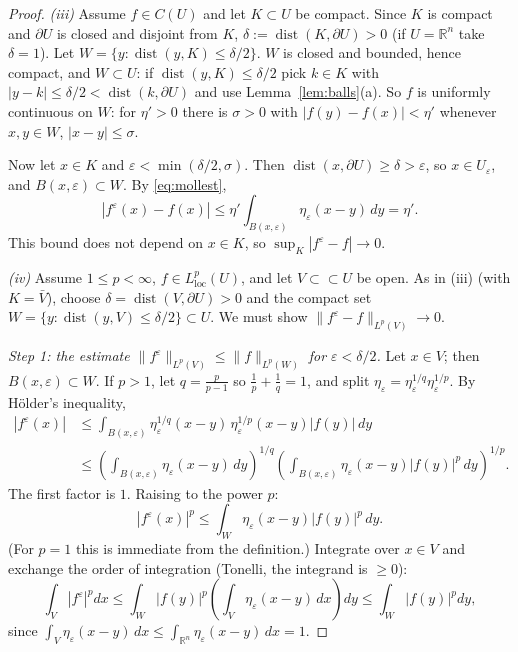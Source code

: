 \documentclass[11pt]{article}
\theoremstyle{plain}
\theoremstyle{definition}
\theoremstyle{remark}
\begin{document}
\begin{proof}
\emph{(iii)} Assume $f \in C(U)$ and let $K \subset U$ be compact. Since $K$ is compact and $\partial U$ is closed and disjoint from $K$, $\delta := \operatorname{dist}(K, \partial U) > 0$ (if $U = \mathbb{R}^n$ take $\delta = 1$). Let $W = \{ y : \operatorname{dist}(y, K) \leq \delta/2 \}$. $W$ is closed and bounded, hence compact, and $W \subset U$: if $\operatorname{dist}(y,K) \le \delta/2$ pick $k \in K$ with $|y - k| \leq \delta/2 < \operatorname{dist}(k,\partial U)$ and use Lemma~\ref{lem:balls}(a). So $f$ is uniformly continuous on $W$: for $\eta' > 0$ there is $\sigma > 0$ with $|f(y) - f(x)| < \eta'$ whenever $x, y \in W$, $|x - y| \leq \sigma$.

Now let $x \in K$ and $\varepsilon < \min(\delta/2, \sigma)$. Then $\operatorname{dist}(x,\partial U) \geq \delta > \varepsilon$, so $x \in U_\varepsilon$, and $B(x,\varepsilon) \subset W$. By \eqref{eq:mollest},
$$ |f^\varepsilon(x) - f(x)| \leq \eta' \int_{B(x,\varepsilon)} \eta_\varepsilon(x-y)\, dy = \eta'. $$
This bound does not depend on $x \in K$, so $\sup_K |f^\varepsilon - f| \to 0$.

\emph{(iv)} Assume $1 \leq p < \infty$, $f \in L^p_{\mathrm{loc}}(U)$, and let $V \subset\subset U$ be open. As in (iii) (with $K = \bar V$), choose $\delta = \operatorname{dist}(V,\partial U) > 0$ and the compact set $W = \{ y : \operatorname{dist}(y, V) \le \delta/2\} \subset U$. We must show $\|f^\varepsilon - f\|_{L^p(V)} \to 0$.

\emph{Step 1: the estimate $\|f^\varepsilon\|_{L^p(V)} \leq \|f\|_{L^p(W)}$ for $\varepsilon < \delta/2$.} Let $x \in V$; then $B(x,\varepsilon) \subset W$. If $p > 1$, let $q = \frac{p}{p-1}$ so $\frac1p + \frac1q = 1$, and split $\eta_\varepsilon = \eta_\varepsilon^{1/q}\eta_\varepsilon^{1/p}$. By H\"older's inequality,
\begin{align*}
|f^\varepsilon(x)| &\leq \int_{B(x,\varepsilon)} \eta_\varepsilon^{1/q}(x-y)\, \eta_\varepsilon^{1/p}(x-y)|f(y)|\, dy \\
&\leq \left( \int_{B(x,\varepsilon)} \eta_\varepsilon(x-y)\, dy \right)^{1/q} \left( \int_{B(x,\varepsilon)} \eta_\varepsilon(x-y)|f(y)|^p\, dy \right)^{1/p}.
\end{align*}
The first factor is $1$. Raising to the power $p$:
$$ |f^\varepsilon(x)|^p \leq \int_{W} \eta_\varepsilon(x-y)|f(y)|^p\, dy. $$
(For $p = 1$ this is immediate from the definition.) Integrate over $x \in V$ and exchange the order of integration (Tonelli, the integrand is $\geq 0$):
$$ \int_V |f^\varepsilon|^p dx \leq \int_W |f(y)|^p \left( \int_V \eta_\varepsilon(x - y)\, dx \right) dy \leq \int_W |f(y)|^p dy, $$
since $\int_V \eta_\varepsilon(x-y)\, dx \leq \int_{\mathbb{R}^n}\eta_\varepsilon(x-y)\, dx = 1$.


\end{proof}
\end{document}
